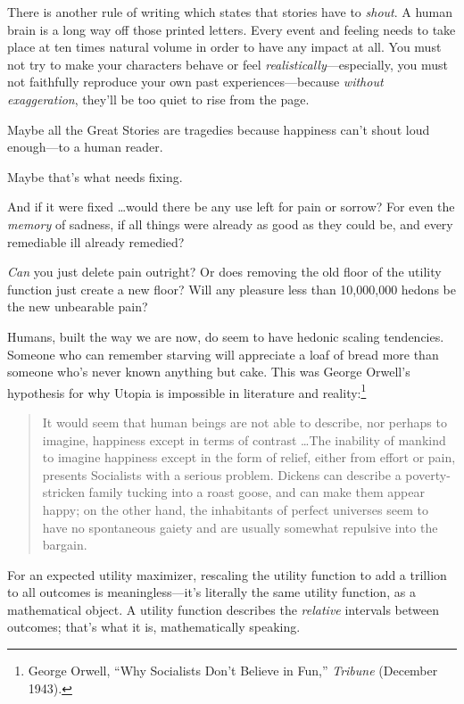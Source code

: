 {
 There is another rule of writing which states that stories have to
\textit{shout}. A human brain is a long way off those printed letters.
Every event and feeling needs to take place at ten times natural volume
in order to have any impact at all. You must not try to make your
characters behave or feel \textit{realistically}{}---especially, you
must not faithfully reproduce your own past experiences---because
\textit{without exaggeration}, they'll be too quiet to
rise from the page.}

{
 Maybe all the Great Stories are tragedies because happiness
can't shout loud enough---to a human reader.}

{
 Maybe that's what needs fixing.}

{
 And if it were fixed \ldots would there be any use left for pain or
sorrow? For even the \textit{memory} of sadness, if all things were
already as good as they could be, and every remediable ill already
remedied?}

{
 \textit{Can} you just delete pain outright? Or does removing the
old floor of the utility function just create a new floor? Will any
pleasure less than 10,000,000 hedons be the new unbearable pain?}

{
 Humans, built the way we are now, do seem to have hedonic scaling
tendencies. Someone who can remember starving will appreciate a loaf of
bread more than someone who's never known anything but
cake. This was George Orwell's hypothesis for why
Utopia is impossible in literature and reality:\footnote{George Orwell, ``Why Socialists
Don't Believe in Fun,''
\textit{Tribune} (December 1943).}}

\begin{quote}
{
 It would seem that human beings are not able to describe, nor
perhaps to imagine, happiness except in terms of contrast \ldots The
inability of mankind to imagine happiness except in the form of relief,
either from effort or pain, presents Socialists with a serious problem.
Dickens can describe a poverty-stricken family tucking into a roast
goose, and can make them appear happy; on the other hand, the
inhabitants of perfect universes seem to have no spontaneous gaiety and
are usually somewhat repulsive into the bargain.}
\end{quote}

{
 For an expected utility maximizer, rescaling the utility function
to add a trillion to all outcomes is meaningless---it's
literally the same utility function, as a mathematical object. A
utility function describes the \textit{relative} intervals between
outcomes; that's what it is, mathematically speaking.}

